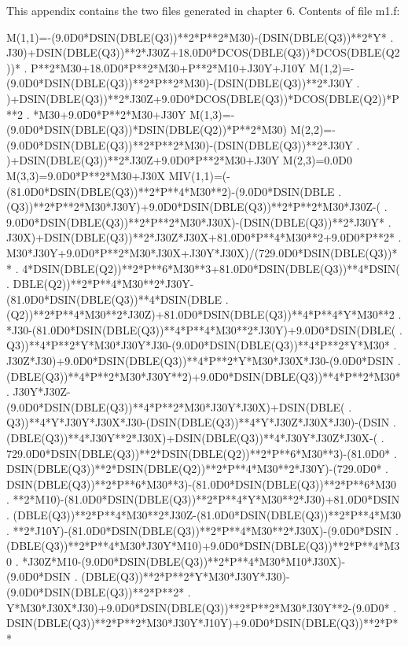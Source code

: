 This appendix contains the two files generated in chapter 6.
Contents of file m1.f:
\begin{framedverbatim}
      M(1,1)=-(9.0D0*DSIN(DBLE(Q3))**2*P**2*M30)-(DSIN(DBLE(Q3))**2*Y*
     . J30)+DSIN(DBLE(Q3))**2*J30Z+18.0D0*DCOS(DBLE(Q3))*DCOS(DBLE(Q2))*
     . P**2*M30+18.0D0*P**2*M30+P**2*M10+J30Y+J10Y
      M(1,2)=-(9.0D0*DSIN(DBLE(Q3))**2*P**2*M30)-(DSIN(DBLE(Q3))**2*J30Y
     . )+DSIN(DBLE(Q3))**2*J30Z+9.0D0*DCOS(DBLE(Q3))*DCOS(DBLE(Q2))*P**2
     . *M30+9.0D0*P**2*M30+J30Y
      M(1,3)=-(9.0D0*DSIN(DBLE(Q3))*DSIN(DBLE(Q2))*P**2*M30)
      M(2,2)=-(9.0D0*DSIN(DBLE(Q3))**2*P**2*M30)-(DSIN(DBLE(Q3))**2*J30Y
     . )+DSIN(DBLE(Q3))**2*J30Z+9.0D0*P**2*M30+J30Y
      M(2,3)=0.0D0
      M(3,3)=9.0D0*P**2*M30+J30X
      MIV(1,1)=(-(81.0D0*DSIN(DBLE(Q3))**2*P**4*M30**2)-(9.0D0*DSIN(DBLE
     . (Q3))**2*P**2*M30*J30Y)+9.0D0*DSIN(DBLE(Q3))**2*P**2*M30*J30Z-(
     . 9.0D0*DSIN(DBLE(Q3))**2*P**2*M30*J30X)-(DSIN(DBLE(Q3))**2*J30Y*
     . J30X)+DSIN(DBLE(Q3))**2*J30Z*J30X+81.0D0*P**4*M30**2+9.0D0*P**2*
     . M30*J30Y+9.0D0*P**2*M30*J30X+J30Y*J30X)/(729.0D0*DSIN(DBLE(Q3))**
     . 4*DSIN(DBLE(Q2))**2*P**6*M30**3+81.0D0*DSIN(DBLE(Q3))**4*DSIN(
     . DBLE(Q2))**2*P**4*M30**2*J30Y-(81.0D0*DSIN(DBLE(Q3))**4*DSIN(DBLE
     . (Q2))**2*P**4*M30**2*J30Z)+81.0D0*DSIN(DBLE(Q3))**4*P**4*Y*M30**2
     . *J30-(81.0D0*DSIN(DBLE(Q3))**4*P**4*M30**2*J30Y)+9.0D0*DSIN(DBLE(
     . Q3))**4*P**2*Y*M30*J30Y*J30-(9.0D0*DSIN(DBLE(Q3))**4*P**2*Y*M30*
     . J30Z*J30)+9.0D0*DSIN(DBLE(Q3))**4*P**2*Y*M30*J30X*J30-(9.0D0*DSIN
     . (DBLE(Q3))**4*P**2*M30*J30Y**2)+9.0D0*DSIN(DBLE(Q3))**4*P**2*M30*
     . J30Y*J30Z-(9.0D0*DSIN(DBLE(Q3))**4*P**2*M30*J30Y*J30X)+DSIN(DBLE(
     . Q3))**4*Y*J30Y*J30X*J30-(DSIN(DBLE(Q3))**4*Y*J30Z*J30X*J30)-(DSIN
     . (DBLE(Q3))**4*J30Y**2*J30X)+DSIN(DBLE(Q3))**4*J30Y*J30Z*J30X-(
     . 729.0D0*DSIN(DBLE(Q3))**2*DSIN(DBLE(Q2))**2*P**6*M30**3)-(81.0D0*
     . DSIN(DBLE(Q3))**2*DSIN(DBLE(Q2))**2*P**4*M30**2*J30Y)-(729.0D0*
     . DSIN(DBLE(Q3))**2*P**6*M30**3)-(81.0D0*DSIN(DBLE(Q3))**2*P**6*M30
     . **2*M10)-(81.0D0*DSIN(DBLE(Q3))**2*P**4*Y*M30**2*J30)+81.0D0*DSIN
     . (DBLE(Q3))**2*P**4*M30**2*J30Z-(81.0D0*DSIN(DBLE(Q3))**2*P**4*M30
     . **2*J10Y)-(81.0D0*DSIN(DBLE(Q3))**2*P**4*M30**2*J30X)-(9.0D0*DSIN
     . (DBLE(Q3))**2*P**4*M30*J30Y*M10)+9.0D0*DSIN(DBLE(Q3))**2*P**4*M30
     . *J30Z*M10-(9.0D0*DSIN(DBLE(Q3))**2*P**4*M30*M10*J30X)-(9.0D0*DSIN
     . (DBLE(Q3))**2*P**2*Y*M30*J30Y*J30)-(9.0D0*DSIN(DBLE(Q3))**2*P**2*
     . Y*M30*J30X*J30)+9.0D0*DSIN(DBLE(Q3))**2*P**2*M30*J30Y**2-(9.0D0*
     . DSIN(DBLE(Q3))**2*P**2*M30*J30Y*J10Y)+9.0D0*DSIN(DBLE(Q3))**2*P**

\end{framedverbatim}
